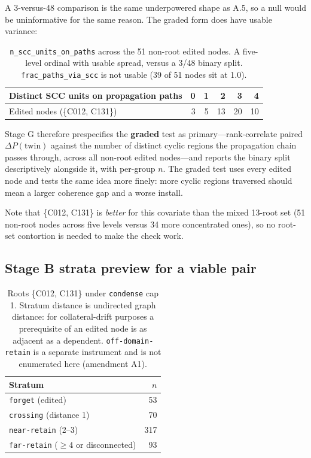 \documentclass[11pt]{article}
\begin{document}
A 3-versus-48 comparison is the same underpowered shape as A.5, so a null would
be uninformative for the same reason. The graded form does have usable variance:

\begin{table}[h]
\centering
\begin{tabular}{lrrrrr}
\toprule
Distinct SCC units on propagation paths & 0 & 1 & 2 & 3 & 4 \\
\midrule
Edited nodes (\{C012, C131\}) & 3 & 5 & 13 & 20 & 10 \\
\bottomrule
\end{tabular}
\caption{\texttt{n\_scc\_units\_on\_paths} across the 51 non-root edited nodes.
A five-level ordinal with usable spread, versus a 3/48 binary split.
\texttt{frac\_paths\_via\_scc} is not usable (39 of 51 nodes sit at 1.0).}
\end{table}

Stage G therefore prespecifies the \textbf{graded} test as primary---rank-correlate
paired $\Delta P(\mathrm{twin})$ against the number of distinct cyclic regions the
propagation chain passes through, across all non-root edited nodes---and reports
the binary split descriptively alongside it, with per-group $n$. The graded test
uses every edited node and tests the same idea more finely: more cyclic regions
traversed should mean a larger coherence gap and a worse install.

Note that \{C012, C131\} is \emph{better} for this covariate than the mixed
13-root set (51 non-root nodes across five levels versus 34 more concentrated
ones), so no root-set contortion is needed to make the check work.

\subsection{Stage B strata preview for a viable pair}

\begin{table}[h]
\centering
\begin{tabular}{lr}
\toprule
Stratum & $n$ \\
\midrule
\texttt{forget} (edited)      & 53 \\
\texttt{crossing} (distance 1) & 70 \\
\texttt{near-retain} (2--3)   & 317 \\
\texttt{far-retain} ($\geq4$ or disconnected) & 93 \\
\bottomrule
\end{tabular}
\caption{Roots \{C012, C131\} under \texttt{condense} cap 1. Stratum distance is
undirected graph distance: for collateral-drift purposes a prerequisite of an
edited node is as adjacent as a dependent. \texttt{off-domain-retain} is a
separate instrument and is not enumerated here (amendment A1).}
\end{table}
\end{document}
